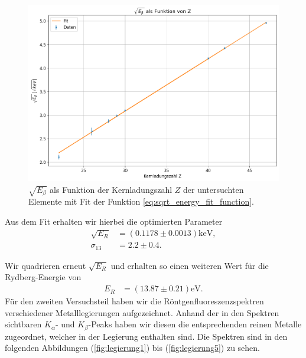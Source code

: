 \begin{figure}[H]
  \centering
  \includegraphics[width=\textwidth]{files/K_beta_vs_Z_with_fit.png}
  \caption{$\sqrt{E_{\beta}}$ als Funktion der Kernladungszahl $Z$ der untersuchten Elemente mit Fit der Funktion \eqref{eq:sqrt_energy_fit_function}.}
  \label{fig:K_beta_vs_Z_with_fit}
\end{figure}

Aus dem Fit erhalten wir hierbei die optimierten Parameter
\begin{align}
  \sqrt{E_R} &= (0.1178 \pm 0.0013) \si{\kilo\electronvolt},\\[1em]
  \sigma_{13} &= 2.2 \pm 0.4.
\end{align}

Wir quadrieren erneut $\sqrt{E_R}$ und erhalten so einen weiteren Wert für die Rydberg-Energie von
\begin{align}
  E_R &= (13.87 \pm 0.21) \si{\electronvolt}.
\end{align}
\newpage\noindent
Für den zweiten Versuchsteil haben wir die Röntgenfluoreszenzspektren verschiedener Metalllegierungen aufgezeichnet. Anhand der in den Spektren sichtbaren $K_{\alpha}$- und $K_{\beta}$-Peaks haben wir diesen die entsprechenden reinen Metalle zugeordnet, welcher in der Legierung enthalten sind. Die Spektren sind in den folgenden Abbildungen (\ref{fig:legierung1}) bis (\ref{fig:legierung5}) zu sehen.
\vspace*{5em}

